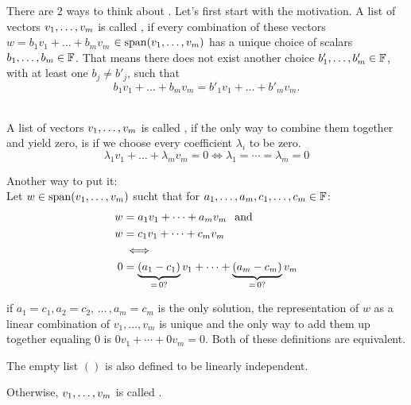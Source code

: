 \setcounter{thm}{14}
\begin{mydef} 
  There are $2$ ways to think about . Let's first start with the motivation. A list of vectors $v_1, \dots, v_m$ is called \qt{\lid}, if every combination of these vectors $w = b_1v_1 + \dots+ b_mv_m$ $\in \operatorname{span} (v_1, \dots, v_m)$ has a unique choice of scalars $b_1, \dots, b_m \in \mathbb{F}$. That means there does not exist another choice $b'_1, \dots, b'_m \in \mathbb{F}$, with at least one $b_j \neq b'_j$, such that
  \begin{equation}
    b_1v_1 + \dots+ b_mv_m = b'_1v_1 + \dots+ b'_mv_m.
  \end{equation}

   \\
  A list of vectors $v_1, \dots, v_m$ is called \lid, if the only way to combine them together and yield zero, is if we choose every coefficient $\lambda_i$ to be zero.
  \begin{equation}
    \lambda_1v_1 + \dots + \lambda_mv_m = 0 \iff \lambda_1 = \cdots = \lambda_m = 0
  \end{equation}

  Another way to put it:\\
  Let $w\in \operatorname{span} (v_1, \dots, v_m)$ sucht that for $a_1, \dots, a_m, c_1, \dots, c_m \in \mathbb{F}$:
  \begin{equation}
    \begin{aligned}
      w & =a_1 v_1 + \cdots + a_m v_m \;\;\, \text{and}\;\; \\
      w & =c_1 v_1 + \cdots + c_m v_m \\
      & \iff \\
      0 & = \underbrace{(a_1 - c_1)}_{= \, 0\text{?}} v_1 + \cdots + \underbrace{(a_m -c_m)}_{= \, 0\text{?}} v_m
    \end{aligned}
  \end{equation}

  if $a_1 = c_1, a_2 = c_2, \, \dots \, , a_m = c_m$ is the only solution, the representation of $w$ as a linear combination of $v_1, \ldots, v_m$ is unique and the only way to add them up together equaling $0$ is $0v_1+\cdots+0v_m=0$. Both of these definitions are equivalent.

  The empty list $()$ is also defined to be linearly independent.
\end{mydef}


\begin{mydef} 
  Otherwise, $v_1, \dots, v_m$ is called .
\end{mydef}

